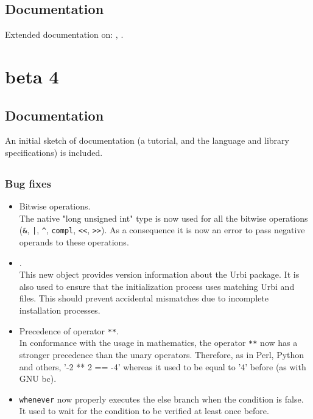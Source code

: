 \subsection{Documentation}

Extended documentation on: , .


\section{ beta 4}

\subsection{Documentation}

An initial sketch of documentation (a tutorial, and the language and
library specifications) is included.

\subsection{\us}
\subsubsection{Bug fixes}

\begin{itemize}
\item Bitwise operations.\\
  The native "long unsigned int" type is now used for all the bitwise
  operations (\lstinline|&|, \lstinline{|}, \lstinline|^|,
  \lstinline|compl|, \lstinline|<<|, \lstinline|>>|).  As a consequence it
  is now an error to pass negative operands to these operations.

\item {}.\\
  This new object provides version information about the Urbi package.  It
  is also used to ensure that the initialization process uses matching Urbi
  and \Cxx files.  This should prevent accidental mismatches due to
  incomplete installation processes.

\item Precedence of operator \lstinline|**|.\\
  In conformance with the usage in mathematics, the operator \lstinline|**|
  now has a stronger precedence than the unary operators.  Therefore, as in
  Perl, Python and others, '-2 ** 2 == -4' whereas it used to be equal to
  '4' before (as with GNU bc).

\item \lstinline|whenever| now properly executes the else branch when the
  condition is false.  It used to wait for the condition to be verified at
  least once before.
\end{itemize}

